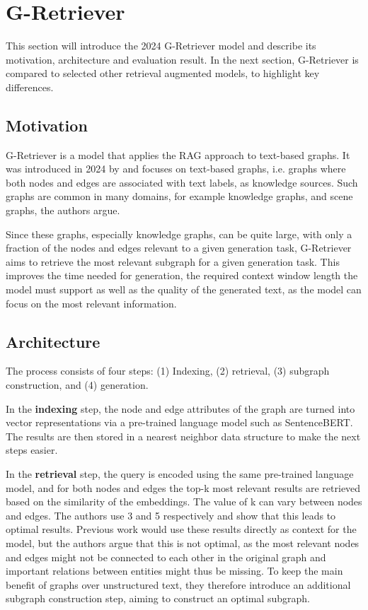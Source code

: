 \section{G-Retriever}

This section will introduce the 2024 G-Retriever model and describe its motivation, architecture and evaluation result. In the next section, G-Retriever is compared to selected other retrieval augmented models, to highlight key differences.

\subsection{Motivation}
G-Retriever is a model that applies the RAG approach to text-based graphs.
It was introduced in 2024 by \cite{g-retriever} and focuses on text-based graphs, i.e. graphs where both nodes and edges are associated with text labels, as knowledge sources.
Such graphs are common in many domains, for example knowledge graphs, and scene graphs, the authors argue.

Since these graphs, especially knowledge graphs, can be quite large, with only a fraction of the nodes and edges relevant to a given generation task, G-Retriever aims to retrieve the most relevant subgraph for a given generation task.
This improves the time needed for generation, the required context window length the model must support as well as the quality of the generated text, as the model can focus on the most relevant information.

\subsection{Architecture}

The process consists of four steps: (1) Indexing, (2) retrieval, (3) subgraph construction, and (4) generation.

In the \textbf{indexing} step, the node and edge attributes of the graph are turned into vector representations via a pre-trained language model such as SentenceBERT.
The results are then stored in a nearest neighbor data structure to make the next steps easier.

In the \textbf{retrieval} step, the query is encoded using the same pre-trained language model, and for both nodes and edges the top-k most relevant results are retrieved based on the similarity of the embeddings. The value of k can vary between nodes and edges. The authors use 3 and 5 respectively and show that this leads to optimal results.
Previous work would use these results directly as context for the model, but the authors argue that this is not optimal, as the most relevant nodes and edges might not be connected to each other in the original graph and important relations between entities might thus be missing.
To keep the main benefit of graphs over unstructured text, they therefore introduce an additional subgraph construction step, aiming to construct an optimal subgraph.


